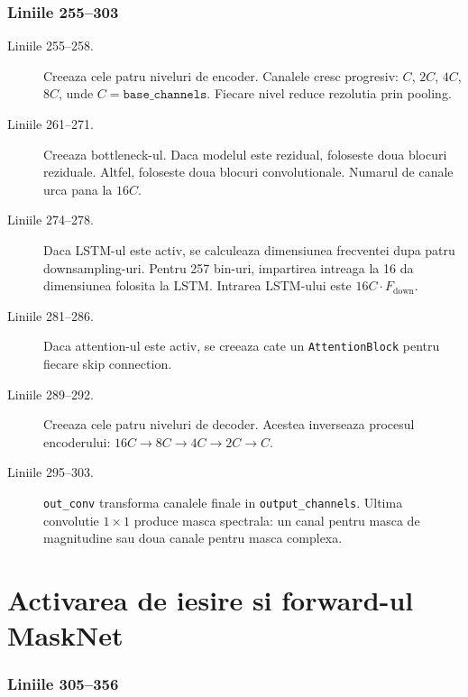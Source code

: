 \documentclass[12pt,a4paper]{report}
\newcommand{\codechunk}[2]{%
\subsection*{Liniile #1--#2}

}
\begin{document}
\codechunk{255}{303}

\begin{description}
    \item[Liniile 255--258.] Creeaza cele patru niveluri de encoder. Canalele cresc
    progresiv: \(C\), \(2C\), \(4C\), \(8C\), unde \(C=\texttt{base\_channels}\).
    Fiecare nivel reduce rezolutia prin pooling.

    \item[Liniile 261--271.] Creeaza bottleneck-ul. Daca modelul este rezidual,
    foloseste doua blocuri reziduale. Altfel, foloseste doua blocuri convolutionale.
    Numarul de canale urca pana la \(16C\).

    \item[Liniile 274--278.] Daca LSTM-ul este activ, se calculeaza dimensiunea
    frecventei dupa patru downsampling-uri. Pentru 257 bin-uri, impartirea intreaga
    la 16 da dimensiunea folosita la LSTM. Intrarea LSTM-ului este
    \(16C \cdot F_{\text{down}}\).

    \item[Liniile 281--286.] Daca attention-ul este activ, se creeaza cate un
    \texttt{AttentionBlock} pentru fiecare skip connection.

    \item[Liniile 289--292.] Creeaza cele patru niveluri de decoder. Acestea inverseaza
    procesul encoderului: \(16C \rightarrow 8C \rightarrow 4C \rightarrow 2C
    \rightarrow C\).

    \item[Liniile 295--303.] \texttt{out\_conv} transforma canalele finale in
    \texttt{output\_channels}. Ultima convolutie \(1 \times 1\) produce masca
    spectrala: un canal pentru masca de magnitudine sau doua canale pentru masca
    complexa.
\end{description}

\chapter{Activarea de iesire si forward-ul MaskNet}

\codechunk{305}{356}
\end{document}
